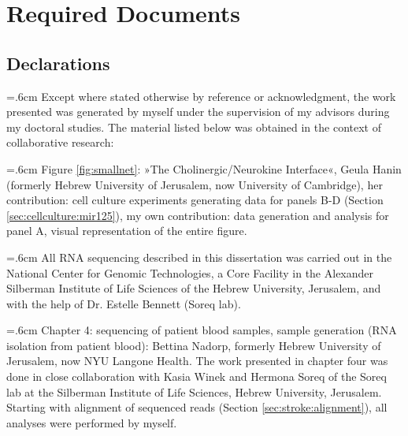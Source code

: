 \chapter{Required Documents} 
\label{appendix:req-doc}

\section{Declarations}
\noindent \hangindent=.6cm Except where stated otherwise by reference or acknowledgment, the work presented was generated by myself under the supervision of my advisors during my doctoral studies. The material listed below was obtained in the context of collaborative research:

\noindent \hangindent=.6cm Figure \ref{fig:smallnet}: »The Cholinergic/Neurokine Interface«, Geula Hanin (formerly Hebrew University of Jerusalem, now University of Cambridge), her contribution: cell culture experiments generating data for panels B-D (Section \ref{sec:cellculture:mir125}), my own contribution: data generation and analysis for panel A, visual representation of the entire figure.

\noindent \hangindent=.6cm All RNA sequencing described in this dissertation was carried out in the National Center for Genomic Technologies, a Core Facility in the Alexander Silberman Institute of Life Sciences of the Hebrew University, Jerusalem, and with the help of Dr. Estelle Bennett (Soreq lab).

\noindent \hangindent=.6cm Chapter 4: sequencing of patient blood samples, sample generation (RNA isolation from patient blood): Bettina Nadorp, formerly Hebrew University of Jerusalem, now NYU Langone Health. The work presented in chapter four was done in close collaboration with Kasia Winek and Hermona Soreq of the Soreq lab at the Silberman Institute of Life Sciences, Hebrew University, Jerusalem. Starting with alignment of sequenced reads (Section \ref{sec:stroke:alignment}), all analyses were performed by myself.

